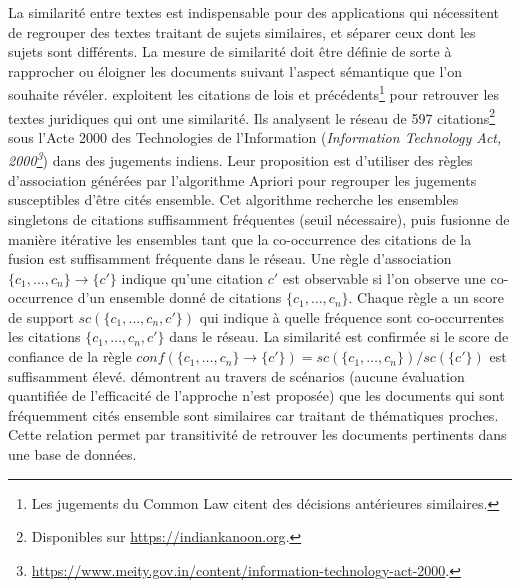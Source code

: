 La similarité entre textes est indispensable pour des applications qui nécessitent de regrouper des textes traitant de sujets similaires, et séparer ceux dont les sujets sont différents. La  mesure de similarité doit être définie de sorte à rapprocher ou éloigner les documents suivant l'aspect sémantique que l'on souhaite révéler. \citet{nair2018judgsimassorule} exploitent les citations de lois et précédents\footnote{Les jugements du \og Common Law \fg{} citent des décisions antérieures similaires.} pour retrouver les textes juridiques qui ont une similarité. Ils analysent le réseau de 597 citations\footnote{Disponibles sur \url{https://indiankanoon.org}.} sous l'Acte 2000 des Technologies de l'Information (\textit{Information Technology Act, 2000\footnote{\url{https://www.meity.gov.in/content/information-technology-act-2000}.}}) dans des jugements indiens. Leur proposition est d'utiliser des règles d'association générées par l'algorithme Apriori \citep{agrawal1994algoApriori} pour regrouper les jugements susceptibles d'être cités ensemble. Cet algorithme recherche les ensembles singletons de citations suffisamment fréquentes (seuil nécessaire), puis fusionne de manière itérative les ensembles tant que la co-occurrence des citations de la fusion est suffisamment fréquente dans le réseau. Une règle d'association $\lbrace c_1,\dots,c_n \rbrace \rightarrow \lbrace c' \rbrace$ indique qu'une citation $c'$ est observable si l'on observe une co-occurrence d'un ensemble donné de citations $\lbrace c_1,\dots,c_n \rbrace$. Chaque règle a un score de support $sc(\lbrace c_1,\dots,c_n, c' \rbrace)$ qui indique à quelle fréquence sont co-occurrentes les citations $\lbrace c_1,\dots,c_n, c' \rbrace$ dans le réseau. La similarité est confirmée si le score de confiance de la règle  $conf(\lbrace c_1,\dots,c_n \rbrace \rightarrow \lbrace c' \rbrace) = sc(\lbrace c_1,\dots,c_n \rbrace) / sc(\lbrace c' \rbrace)$ est suffisamment élevé.
\citet{nair2018judgsimassorule} démontrent au travers de scénarios (aucune évaluation quantifiée de l'efficacité de l'approche n'est proposée) que les documents qui sont fréquemment cités ensemble sont similaires car traitant de thématiques proches. Cette relation permet par transitivité de retrouver les documents pertinents dans une base de données. 

